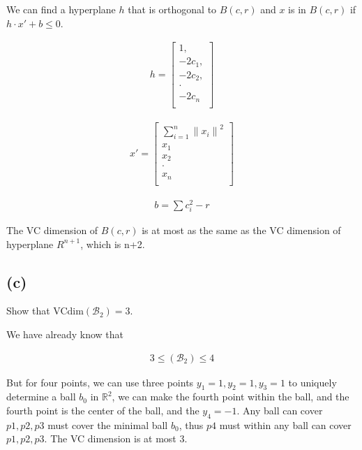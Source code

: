 \documentclass{article}
\begin{document}
We can find a hyperplane $h$ that is orthogonal to $B(c, r)$ and $x$ is in $B(c, r)$ if $h \cdot x' + b \leq 0$.

\begin{align}
    h =
    \begin{bmatrix}
        1,       \\
        -2c_{1}, \\
        -2c_{2}, \\
        \cdot    \\
        -2c_{n}  \\
    \end{bmatrix}
\end{align}


\begin{align}
    x' =
    \begin{bmatrix}
        \sum_{i=1}^{n} {\|x_{i}\|}^2 \\
        x_{1}                        \\
        x_{2}                        \\
        \cdot                        \\
        x_{n}                        \\
    \end{bmatrix}
\end{align}


\begin{align}
    b = \sum c_{i}^{2} - r
\end{align}

The VC dimension of $B(c, r)$ is at most as the same as the VC dimension of hyperplane $R^{n+1}$, which is n+2.


\subsection*{(c)}
Show that VCdim$\left(\mathcal{B}_{2}\right)=3$.

We have already know that

\begin{align}
    3 \leq \left(\mathcal{B}_{2}\right) \leq 4
\end{align}

But for four points, we can use three points $y_1=1, y_2=1, y_3=1$ to uniquely determine a ball $b_0$ in $\mathbb{R}^{2}$, we can make the fourth point within the ball, and the fourth point is the center of the ball, and the $y_4 = -1$. Any ball can cover $p1, p2, p3$ must cover the minimal ball $b_0$, thus $p4$ must within any ball can cover $p1, p2, p3$. The VC dimension is at most 3.
\end{document}
